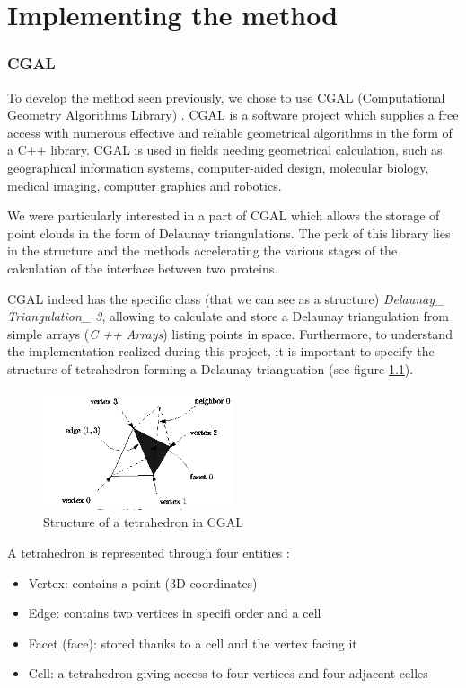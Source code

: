 \chapter{Implementing the method}

\subsection{CGAL}
To develop the method seen previously, we chose to use CGAL (Computational Geometry
 Algorithms Library) \cite{CGAL}.
CGAL is a software project which supplies a free access with numerous effective
 and reliable geometrical algorithms in the form of a C++ library. CGAL is used
  in fields needing geometrical calculation, such as geographical
  information systems, computer-aided design, molecular biology, medical imaging,
   computer graphics and robotics.

   We were particularly interested in a part of CGAL which allows the storage
   of point  clouds in the form of Delaunay triangulations. The perk of
   this library lies in the structure and the methods accelerating the various
   stages of the calculation of the interface between two proteins.

CGAL indeed has the specific class (that we can see as a structure)
\textit{Delaunay\_ Triangulation\_ 3}, allowing to calculate and store a Delaunay triangulation
 from simple arrays (\textit {C ++ Arrays}) listing points in space.
  Furthermore, to understand the implementation realized during this project, it is important
   to specify the structure of tetrahedron forming a Delaunay trianguation
    (see figure \ref{fig::tetrahedron_cgal}).

\begin{figure}[ht]
\centering
  \includegraphics[width=0.5\textwidth]{figures/tetrahedron_cgal.png}
  \caption{Structure of a tetrahedron in CGAL}
  \label{fig::tetrahedron_cgal}
\end{figure}

A tetrahedron is represented through four entities :
\begin{itemize}
  \item Vertex: contains a point (3D coordinates)
  \item Edge: contains two vertices in specifi order and a cell
  \item Facet (face): stored thanks to a cell and the vertex facing it
  \item Cell: a tetrahedron giving access to four vertices and four adjacent celles
\end{itemize}


